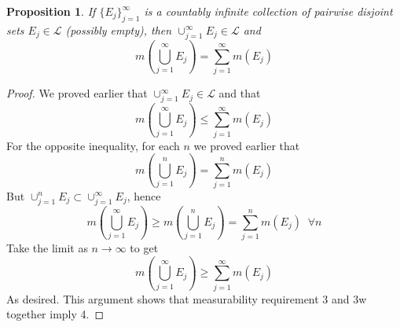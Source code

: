 \documentclass[11pt]{article}
\newtheorem*{prop}{Proposition}
\begin{document}
    \begin{prop}
        If $\{ E_j \}_{j=1}^{\infty}$ is a countably infinite collection of pairwise disjoint sets $E_j \in \mathcal{L}$ (possibly empty), then $\cup_{j=1}^{\infty} E_j \in \mathcal{L}$ and
        \[
            m\left(\bigcup_{j=1}^{\infty} E_j\right) = \sum_{j=1}^{\infty} m(E_j)
        \]
    \end{prop}

    \begin{proof}
        We proved earlier that $\cup_{j=1}^{\infty} E_j \in \mathcal{L}$ and that
        \[
            m\left(\bigcup_{j=1}^{\infty} E_j\right) \leq \sum_{j=1}^{\infty} m(E_j)
        \]
        For the opposite inequality, for each $n$ we proved earlier that
        \[
            m\left(\bigcup_{j=1}^{n} E_j\right) = \sum_{j=1}^{n} m(E_j)
        \]
        But $\cup_{j=1}^{n} E_j \subset \cup_{j=1}^{\infty} E_j$, hence
        \[
            m\left(\bigcup_{j=1}^{\infty} E_j\right) \geq m\left(\bigcup_{j=1}^{n} E_j\right) =  \sum_{j=1}^{n} m(E_j) \;\; \forall n
        \]
        Take the limit as $n \rightarrow \infty$ to get
        \[
            m\left(\bigcup_{j=1}^{\infty} E_j\right) \geq \sum_{j=1}^{\infty} m(E_j)
        \]
        As desired.
        This argument shows that measurability requirement 3 and 3w together imply 4.
    \end{proof}
\end{document}

